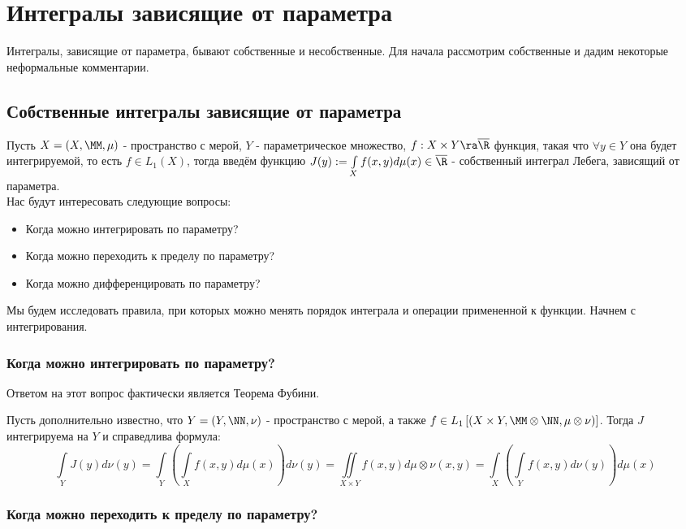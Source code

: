 \section{Интегралы зависящие от параметра}
Интегралы, зависящие от параметра, бывают собственные и несобственные. Для начала рассмотрим собственные и дадим некоторые неформальные комментарии.

\subsection{Собственные интегралы зависящие от параметра}

 Пусть $X = (X, \MM, \mu)$ - пространство с мерой, $Y$ - параметрическое множество, $f : X \times Y \ra \overline{\R}$ функция, такая что $\forall y \in Y$ она будет интегрируемой, то есть $f \in L_1(X)$, тогда введём функцию $J(y) := \int\limits_X f(x, y) d\mu(x) \in \overline{\R}$ - собственный интеграл Лебега, зависящий от параметра.
\\
Нас будут интересовать следующие вопросы:
\begin{itemize}
    \item Когда можно интегрировать по параметру?
    \item Когда можно переходить к пределу по параметру?
    \item Когда можно дифференцировать по параметру?
\end{itemize}


Мы будем исследовать правила, при которых можно менять порядок интеграла и операции примененной к функции. Начнем с интегрирования.

\subsubsection{Когда можно интегрировать по параметру?}

Ответом на этот вопрос фактически является Теорема Фубини.

\theorem Пусть дополнительно известно, что $Y = (Y, \NN, \nu)$ - пространство с мерой, а также $f \in L_1\left[ (X \times Y, \MM \otimes \NN, \mu \otimes \nu) \right]$. Тогда $J$ интегрируема на $Y$ и справедлива формула: $$\int\limits_Y J(y)d\nu(y) = \int\limits_Y \left( \int\limits_X f(x,y)d\mu(x) \right) d\nu(y) = \iint\limits_{X \times Y} f(x,y) d \mu\otimes\nu(x, y) = \int\limits_X \left( \int\limits_Y f(x, y) d\nu(y) \right) d\mu(x)$$

\subsubsection{Когда можно переходить к пределу по параметру?}

